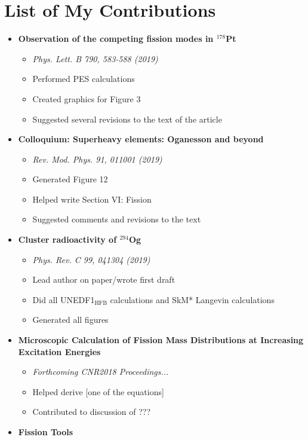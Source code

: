 \chapter{List of My Contributions}\label{append:Contributions}

\begin{itemize}
	\item \textbf{Observation of the competing fission modes in $^{178}$Pt}
	\begin{itemize}
		\item \textit{Phys. Lett. B 790, 583-588 (2019)}
		\item Performed PES calculations
		\item Created graphics for Figure 3
		\item Suggested several revisions to the text of the article
	\end{itemize}
	\item \textbf{Colloquium: Superheavy elements: Oganesson and beyond}
	\begin{itemize}
		\item \textit{Rev. Mod. Phys. 91, 011001 (2019)}
		\item Generated Figure 12
		\item Helped write Section VI: Fission
		\item Suggested comments and revisions to the text
	\end{itemize}
	\item \textbf{Cluster radioactivity of $^{294}$Og}
	\begin{itemize}
		\item \textit{Phys. Rev. C 99, 041304 (2019)}
		\item Lead author on paper/wrote first draft
		\item Did all UNEDF1$_{\mathrm{HFB}}$ calculations and SkM* Langevin calculations
		\item Generated all figures
	\end{itemize}
	\item \textbf{Microscopic Calculation of Fission Mass Distributions at Increasing Excitation Energies}
	\begin{itemize}
		\item \textit{Forthcoming CNR2018 Proceedings...}
		\item Helped derive [one of the equations]
		\item Contributed to discussion of ???
	\end{itemize}
	\item \textbf{Fission Tools}

\end{itemize}
